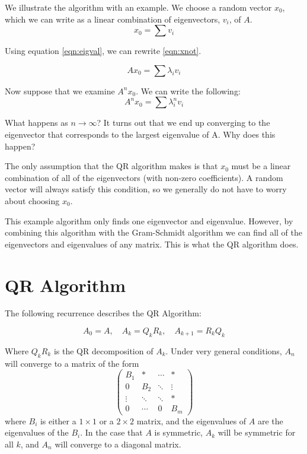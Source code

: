 We illustrate the algorithm with an example. We choose a random vector $x_0$, which we can write as a linear combination of eigenvectors, $v_i$, of $A$.
\begin{equation}
\label{eqn:xnot}
x_0 = \sum v_i
\end{equation}

Using equation \ref{eqn:eigval}, we can rewrite \ref{eqn:xnot}.

\begin{equation*}
Ax_0 = \sum \lambda_i v_i
\end{equation*}

Now suppose that we examine $A^n x_0$. We can write the following:
\begin{equation*}
A^n x_0 = \sum \lambda_i^n v_i
\end{equation*}

What happens as $n \rightarrow \infty$? It turns out that we end up converging to the eigenvector that corresponds to the largest eigenvalue of A. Why does this happen?

The only assumption that the QR algorithm makes is that $x_0$ must be a linear combination of all of the eigenvectors (with non-zero coefficients). A random vector will always satisfy this condition, so we generally do not have to worry about choosing $x_0$.

This example algorithm only finds one eigenvector and eigenvalue. However, by combining this algorithm with the Gram-Schmidt algorithm we can find all of the eigenvectors and eigenvalues of any matrix. This is what the QR algorithm does.

\section*{QR Algorithm}

The following recurrence describes the QR Algorithm:

\begin{equation*}
A_0 = A, \quad A_k = Q_k R_k, \quad A_{k+1} = R_k Q_k
\end{equation*}

Where $Q_k R_k$ is the QR decomposition of $A_k$. 
Under very general conditions, $A_n$ will converge to a matrix of the form
\begin{equation*}
     \begin{pmatrix}
          B_1 &* & \cdots & * \\
           0     &B_2  &  \ddots & \vdots \\
           \vdots  & \ddots & \ddots & *  \\
           0 & \cdots & 0 & B_m
    \end{pmatrix}
\end{equation*}
where $B_i$ is either a $1 \times 1$ or a $2 \times 2$ matrix, and the eigenvalues of $A$ are the eigenvalues of the $B_i$. In the case that $A$ is symmetric, $A_k$ will be symmetric for all $k$, and $A_n$ will converge to a diagonal matrix.

